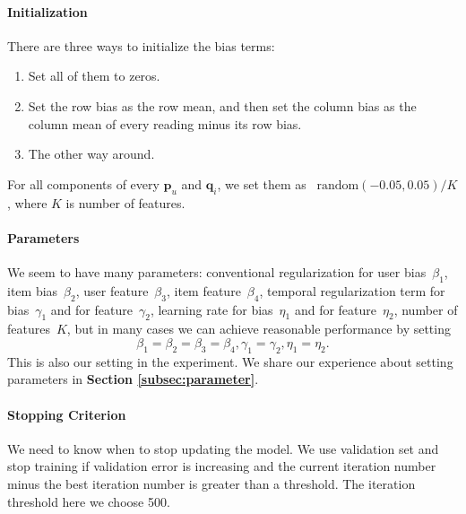 \paragraph*{Initialization}

There are three ways to initialize the bias terms:
\begin{enumerate}
	\setlength {\itemsep}{-5pt}
	\item Set all of them to zeros.
	\item Set the row bias as the row mean, and then set the column bias as the column mean of every reading minus its row bias.
	\item The other way around.
\end{enumerate}
For all components of every $\mathbf{p}_{u}$ and $\mathbf{q}_{i}$, we set them as ~$\mbox{random}(-0.05,0.05)/K$, where $K$ is number of features.

\paragraph*{Parameters}

We seem to have many parameters: conventional regularization for user bias~$\beta_1$, item bias~$\beta_2$, user feature~$\beta_3$, item feature~$\beta_4$, temporal regularization term for bias~$\gamma_1$ and for feature~$\gamma_2$, learning rate for bias~$\eta_1$ and for feature~$\eta_2$, number of features~$K$, but in many cases we can achieve reasonable performance by setting 
\begin{equation*}\beta_1 = \beta_2 = \beta_3 = \beta_4, \gamma_1 = \gamma_2, \eta_1 = \eta_2. \end{equation*}
This is also our setting in the experiment. We share our experience about setting parameters in \textbf{Section \ref{subsec:parameter}}.

\paragraph*{Stopping Criterion}

We need to know when to stop updating the model. We use validation set and stop training if validation error is increasing and the current iteration number minus the best iteration number is greater than a threshold.  The iteration threshold here we choose 500. 

